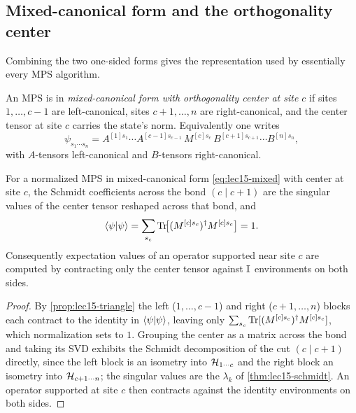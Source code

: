 \subsection{Mixed-canonical form and the orthogonality center}

Combining the two one-sided forms gives the representation used by essentially
every MPS algorithm.

\begin{definition}\label{def:lec15-mixed}
An MPS is in \emph{mixed-canonical form with orthogonality center at site $c$} if
sites $1,\dots,c-1$ are left-canonical, sites $c+1,\dots,n$ are right-canonical,
and the center tensor at site $c$ carries the state's norm. Equivalently one
writes
\begin{equation}\label{eq:lec15-mixed}
  \psi_{s_1\cdots s_n}=A^{[1]s_1}\cdots A^{[c-1]s_{c-1}}\,
    M^{[c]s_c}\,B^{[c+1]s_{c+1}}\cdots B^{[n]s_n},
\end{equation}
with $A$-tensors left-canonical and $B$-tensors right-canonical.
\end{definition}

\begin{theorem}\label{thm:lec15-center}
For a normalized MPS in mixed-canonical form \eqref{eq:lec15-mixed} with center
at site $c$, the Schmidt coefficients across the bond $(c\mid c+1)$ are the
singular values of the center tensor reshaped across that bond, and
\[
  \braket{\psi|\psi}=\sum_{s_c}\operatorname{Tr}\!\bigl[(M^{[c]s_c})^{\dagger} M^{[c]s_c}\bigr]=1 .
\]
Consequently expectation values of an operator supported near site $c$ are
computed by contracting only the center tensor against $\mathbb{I}$ environments on both
sides.
\end{theorem}

\begin{proof}
By \cref{prop:lec15-triangle} the left ($1,\dots,c-1$) and right
($c+1,\dots,n$) blocks each contract to the identity in $\braket{\psi|\psi}$,
leaving only $\sum_{s_c}\operatorname{Tr}[(M^{[c]s_c})^{\dagger} M^{[c]s_c}]$, which normalization sets
to $1$. Grouping the center as a matrix across the bond and taking its SVD
exhibits the Schmidt decomposition of the cut $(c\mid c+1)$ directly, since the
left block is an isometry into $\mathcal{H}_{1\cdots c}$ and the right block an isometry
into $\mathcal{H}_{c+1\cdots n}$; the singular values are the $\lambda_k$ of
\cref{thm:lec15-schmidt}. An operator supported at site $c$ then contracts against
the identity environments on both sides.
\end{proof}


